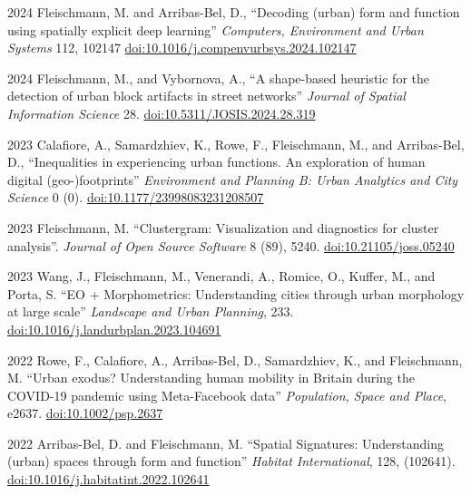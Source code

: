 \documentclass[12pt,a4paper]{report}
\begin{document}
    \begin{tablist}

        \item[2024] \tab{}Fleischmann, M. and Arribas-Bel, D., \enquote{Decoding (urban) form and function using spatially explicit deep learning} \textit{Computers, Environment and Urban Systems} 112, 102147 \href{https://doi.org/10.1016/j.compenvurbsys.2024.102147}{doi:10.1016/j.compenvurbsys.2024.102147}

        \item[2024] \tab{}Fleischmann, M., and Vybornova, A., \enquote{A shape-based heuristic for the detection of urban block artifacts in street networks} \textit{Journal of Spatial Information Science} 28. \href{https://doi.org/10.5311/JOSIS.2024.28.319}{doi:10.5311/JOSIS.2024.28.319}

        \item[2023] \tab{}Calafiore, A., Samardzhiev, K., Rowe, F., Fleischmann, M., and Arribas-Bel, D., \enquote{Inequalities in experiencing urban functions. An exploration of human digital (geo-)footprints} \textit{Environment and Planning B: Urban Analytics and City Science} 0 (0). \href{https://doi.org/10.1177/23998083231208507}{doi:10.1177/23998083231208507}

        \item[2023] \tab{}Fleischmann, M. \enquote{Clustergram: Visualization and diagnostics for cluster analysis}. \textit{Journal of Open Source Software} 8 (89), 5240. \href{https://doi.org/10.21105/joss.05240}{doi:10.21105/joss.05240}

        \item[2023] \tab{}Wang, J., Fleischmann, M., Venerandi, A., Romice, O., Kuffer, M., and Porta, S. \enquote{EO + Morphometrics: Understanding cities through urban morphology at large scale} \textit{Landscape and Urban Planning}, 233. \href{https://doi.org/10.1016/j.landurbplan.2023.104691}{doi:10.1016/j.landurbplan.2023.104691}

        \item[2022] \tab{}Rowe, F., Calafiore, A., Arribas-Bel, D., Samardzhiev, K., and Fleischmann, M. \enquote{Urban exodus? Understanding human mobility in Britain during the COVID-19 pandemic using Meta-Facebook data} \textit{Population, Space and Place}, e2637. \href{https://doi.org/10.1002/psp.2637}{doi:10.1002/psp.2637}

        \item[2022] \tab{}Arribas-Bel, D. and Fleischmann, M. \enquote{Spatial Signatures: Understanding (urban) spaces through form and function} \textit{Habitat International}, 128, (102641). \href{https://doi.org/10.1016/j.habitatint.2022.102641}{doi:10.1016/j.habitatint.2022.102641}


\end{tablist}
\end{document}
